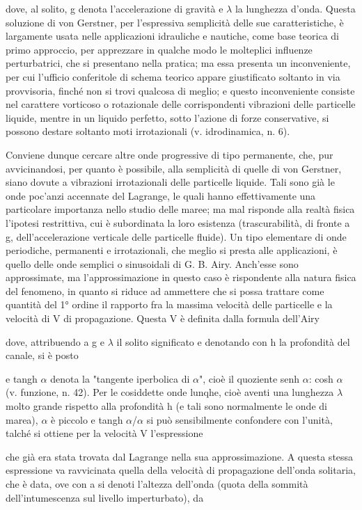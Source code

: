 \documentclass[a4paper]{article}
\begin{document}
dove, al solito, g denota l'accelerazione di gravità e $\lambda$ la lunghezza d'onda. Questa soluzione di von Gerstner, per l'espressiva semplicità delle sue caratteristiche, è largamente usata nelle applicazioni idrauliche e nautiche, come base teorica di primo approccio, per apprezzare in qualche modo le molteplici influenze perturbatrici, che si presentano nella pratica; ma essa presenta un inconveniente, per cui l'ufficio conferitole di schema teorico appare giustificato soltanto in via provvisoria, finché non si trovi qualcosa di meglio; e questo inconveniente consiste nel carattere vorticoso o rotazionale delle corrispondenti vibrazioni delle particelle liquide, mentre in un liquido perfetto, sotto l'azione di forze conservative, si possono destare soltanto moti irrotazionali (v. idrodinamica, n. 6).

Conviene dunque cercare altre onde progressive di tipo permanente, che, pur avvicinandosi, per quanto è possibile, alla semplicità di quelle di von Gerstner, siano dovute a vibrazioni irrotazionali delle particelle liquide. Tali sono già le onde poc'anzi accennate del Lagrange, le quali hanno effettivamente una particolare importanza nello studio delle maree; ma mal risponde alla realtà fisica l'ipotesi restrittiva, cui è subordinata la loro esistenza (trascurabilità, di fronte a g, dell'accelerazione verticale delle particelle fluide). Un tipo elementare di onde periodiche, permanenti e irrotazionali, che meglio si presta alle applicazioni, è quello delle onde semplici o sinusoidali di G. B. Airy. Anch'esse sono approssimate, ma l'approssimazione in questo caso è rispondente alla natura fisica del fenomeno, in quanto si riduce ad ammettere che si possa trattare come quantità del 1° ordine il rapporto fra la massima velocità delle particelle e la velocità di V di propagazione. Questa V è definita dalla formula dell'Airy

dove, attribuendo a g e $\lambda$ il solito significato e denotando con h la profondità del canale, si è posto

e tangh $\alpha$ denota la "tangente iperbolica di $\alpha$", cioè il quoziente senh $\alpha$: cosh $\alpha$ (v. funzione, n. 42). Per le cosiddette onde lunqhe, cioè aventi una lunghezza $\lambda$ molto grande rispetto alla profondità h (e tali sono normalmente le onde di marea), $\alpha$ è piccolo e tangh $\alpha$/$\alpha$ si può sensibilmente confondere con l'unità, talché si ottiene per la velocità V l'espressione

che già era stata trovata dal Lagrange nella sua approssimazione. A questa stessa espressione va ravvicinata quella della velocità di propagazione dell'onda solitaria, che è data, ove con a si denoti l'altezza dell'onda (quota della sommità dell'intumescenza sul livello imperturbato), da
\end{document}
